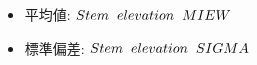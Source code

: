 \documentclass[]{jarticle}
\begin{document}
	  \begin{itemize}
	   \item 平均値: $Stem\hspace{0.2cm}elevation\hspace{0.2cm}MIEW$
	   \item 標準偏差: $Stem\hspace{0.2cm}elevation\hspace{0.2cm}SIGMA$
	  \end{itemize}
\end{document}
